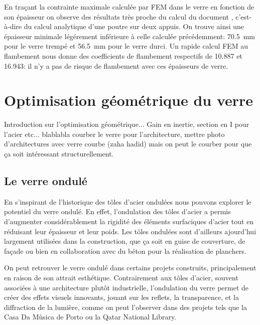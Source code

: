 \documentclass[11pt,titlepage]{article}
\begin{document}
En traçant la contrainte maximale calculée par \acrshort{FEM} dans le verre en fonction de son épaisseur on observe des résultats très proche du calcul du document \Textcite{fdp78}, c'est-à-dire du calcul analytique d'une poutre sur deux appuis. On trouve ainsi une épaisseur minimale légérement inférieure à celle calculée précédemment: \qty{70.5}{\milli\meter} pour le verre trempé et \qty{56.5}{\milli\meter} pour le verre durci. Un rapide calcul \acrshort{FEM} au flambement nous donne des coefficients de flambement respectifs de 10.887 et 16.943: il n'y a pas de risque de flambement avec ces épaisseurs de verre. 
\newpage

\section{Optimisation géométrique du verre}

Introduction sur l'optimisation géométrique... Gain en inertie, section en I pour l'acier etc...
blablabla courber le verre pour l'architecture, mettre photo d'architectures avec verre courbe (zaha hadid)
mais on peut le courber pour que ça soit intéressant structurellement.

\newpage
\subsection{Le verre ondulé}

En s'inspirant de l'historique des tôles d'acier ondulées nous pouvons explorer le potentiel du verre ondulé. En effet, l'ondulation des tôles d'acier a permis d'augmenter considérablement la rigidité des éléments surfaciques d'acier tout en réduisant leur épaisseur et leur poids. Les tôles ondulées sont d'ailleurs ajourd'hui largement utilisées dans la construction, que ça soit en guise de couverture, de façade ou bien en collaboration avec du béton pour la réalisation de planchers.

On peut retrouver le verre ondulé dans certains projets construits, principalement en raison de son attrait esthétique. Contrairement aux tôles d’acier, souvent associées à une architecture plutôt industrielle, l’ondulation du verre permet de créer des effets visuels innovants, jouant sur les reflets, la transparence, et la diffraction de la lumière, comme on peut l'observer dans des projets tels que la Casa Da Mùsica de Porto ou la Qatar National Library. 
\end{document}
